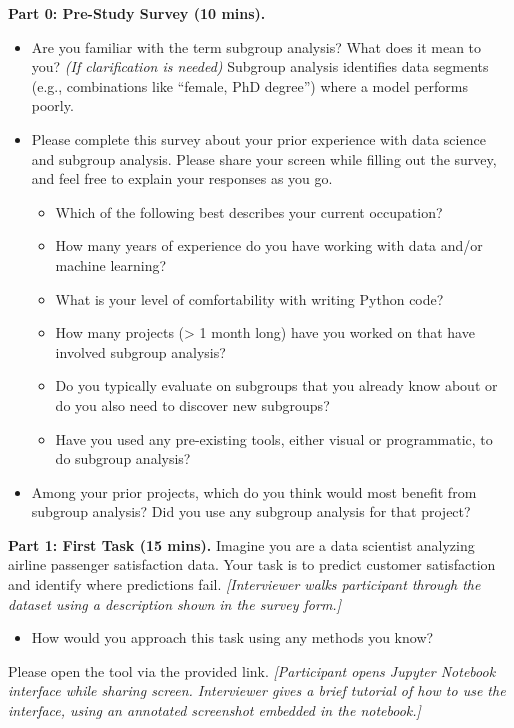 \noindent \textbf{Part 0: Pre-Study Survey (10 mins).}
\begin{itemize}
    \item Are you familiar with the term subgroup analysis? What does it mean to you? \textit{(If clarification is needed)} Subgroup analysis identifies data segments (e.g., combinations like ``female, PhD degree'') where a model performs poorly.  
    \item Please complete this survey about your prior experience with data science and subgroup analysis. Please share your screen while filling out the survey, and feel free to explain your responses as you go.
    \begin{itemize}
        \item Which of the following best describes your current occupation?
        \item How many years of experience do you have working with data and/or machine learning?
        \item What is your level of comfortability with writing Python code?
        \item How many projects (> 1 month long) have you worked on that have involved subgroup analysis?
        \item Do you typically evaluate on subgroups that you already know about or do you also need to discover new subgroups?
        \item Have you used any pre-existing tools, either visual or programmatic, to do subgroup analysis?
    \end{itemize}
    \item Among your prior projects, which do you think would most benefit from subgroup analysis? Did you use any subgroup analysis for that project?
\end{itemize}

\noindent \textbf{Part 1: First Task (15 mins).}
Imagine you are a data scientist analyzing airline passenger satisfaction data. Your task is to predict customer satisfaction and identify where predictions fail. \textit{[Interviewer walks participant through the dataset using a description shown in the survey form.]}
\begin{itemize}
    \item How would you approach this task using any methods you know?  
\end{itemize}

Please open the tool via the provided link. \textit{[Participant opens Jupyter Notebook interface while sharing screen. Interviewer gives a brief tutorial of how to use the interface, using an annotated screenshot embedded in the notebook.]}

